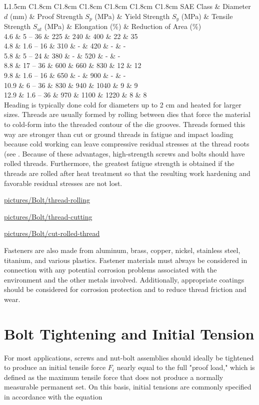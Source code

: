 \documentclass[a4paper,openany,12pt]{book}
\begin{document}
{{ L1.5cm C1.8cm C1.8cm C1.8cm C1.8cm C1.8cm C1.8cm SAE Class \& Diameter
\(d\) (mm) \& Proof Strength \(S_p\) (MPa) \& Yield Strength \(S_y\) (MPa) \&
Tensile Strength \(S_{ut}\) (MPa) \& Elongation (\%) \& Reduction of Area
(\%)\\
4.6 \& 5 -- 36 \& 225 \& 240 \& 400 \& 22 \& 35\\
4.8 \& 1.6 -- 16 \& 310 \& - \& 420 \& - \& -\\
5.8 \& 5 -- 24 \& 380 \& - \& 520 \& - \& -\\
8.8 \& 17 -- 36 \& 600 \& 660 \& 830 \& 12 \& 12\\
9.8 \& 1.6 -- 16 \& 650 \& - \& 900 \& - \& -\\
10.9 \& 6 -- 36 \& 830 \& 940 \& 1040 \& 9 \& 9\\
12.9 \& 1.6 -- 36 \& 970 \& 1100 \& 1220 \& 8 \& 8\\

Heading is typically done cold for diameters up to 2 cm and heated for
larger sizes. Threads are usually formed by rolling between dies that
force the material to cold-form into the threaded contour of the die
grooves. Threads formed this way are stronger than cut or ground threads
in fatigue and impact loading because cold working can leave compressive
residual stresses at the thread roots (see . Because of these
advantages, high-strength screws and bolts should have rolled threads.
Furthermore, the greatest fatigue strength is obtained if the threads
are rolled after heat treatment so that the resulting work hardening and
favorable residual stresses are not lost.


\url{pictures/Bolt/thread-rolling}


\url{pictures/Bolt/thread-cutting}


\url{pictures/Bolt/cut-rolled-thread}

Fasteners are also made from aluminum, brass, copper, nickel, stainless
steel, titanium, and various plastics. Fastener materials must always be
considered in connection with any potential corrosion problems
associated with the environment and the other metals involved.
Additionally, appropriate coatings should be considered for corrosion
protection and to reduce thread friction and wear.

\section{Bolt Tightening and Initial Tension}
\label{bolt-tightening-and-initial-tension}
For most applications, screws and nut-bolt assemblies should ideally be
tightened to produce an initial tensile force \(F_i\) nearly equal to the
full "proof load," which is defined as the maximum tensile force that
does not produce a normally measurable permanent set. On this basis,
initial tensions are commonly specified in accordance with the equation

}}
\end{document}
